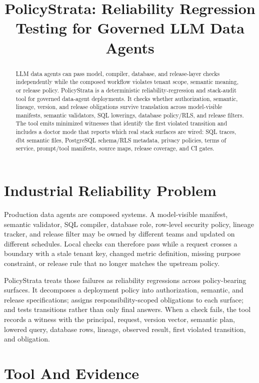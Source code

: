 \documentclass[10pt,conference]{IEEEtran}
\title{PolicyStrata: Reliability Regression Testing for Governed LLM Data Agents}
\author{\IEEEauthorblockN{Zachary Roth}
\IEEEauthorblockA{Raintree Technology\\
USA\\
admin@raintree.technology}}
\begin{document}
\maketitle

\begin{abstract}
LLM data agents can pass model, compiler, database, and release-layer checks independently while the composed workflow violates tenant scope, semantic meaning, or release policy. PolicyStrata is a deterministic reliability-regression and stack-audit tool for governed data-agent deployments. It checks whether authorization, semantic, lineage, version, and release obligations survive translation across model-visible manifests, semantic validators, SQL lowerings, database policy/RLS, and release filters. The tool emits minimized witnesses that identify the first violated transition and includes a doctor mode that reports which real stack surfaces are wired: SQL traces, dbt semantic files, PostgreSQL schema/RLS metadata, privacy policies, terms of service, prompt/tool manifests, source maps, release coverage, and CI gates.
\end{abstract}

\section{Industrial Reliability Problem}

Production data agents are composed systems. A model-visible manifest, semantic validator, SQL compiler, database role, row-level security policy, lineage tracker, and release filter may be owned by different teams and updated on different schedules. Local checks can therefore pass while a request crosses a boundary with a stale tenant key, changed metric definition, missing purpose constraint, or release rule that no longer matches the upstream policy.

PolicyStrata treats those failures as reliability regressions across policy-bearing surfaces. It decomposes a deployment policy into authorization, semantic, and release specifications; assigns responsibility-scoped obligations to each surface; and tests transitions rather than only final answers. When a check fails, the tool records a witness with the principal, request, version vector, semantic plan, lowered query, database rows, lineage, observed result, first violated transition, and obligation.

\section{Tool And Evidence}
\end{document}
